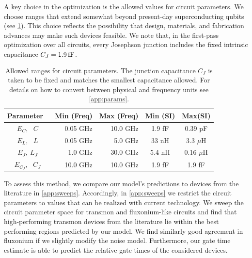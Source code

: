 A key choice in the optimization is the allowed values for circuit parameters. We choose ranges that extend somewhat beyond present-day superconducting qubits (see \cref{tab:params_overview}). This choice reflects the possibility that design, materials, and fabrication advances may make such devices feasible. We note that, in the first-pass optimization over all circuits, every Josephson junction includes the fixed intrinsic capacitance $C_J=1.9\,{\rm fF}$.

\begin{table}[htbp]
\setlength{\tabcolsep}{4.5pt}
\begin{tabular}{@{}crrcc@{}}
\toprule
Parameter \,\,      &  Min (Freq) & Max (Freq) & Min (SI) &  Max(SI) \\ \toprule
$E_C$,~ $C$                  & 0.05 GHz &  10.0 GHz & 1.9 fF  & 0.39 pF \\ \midrule
$E_L$,~ $L$                  & 0.05 GHz &  \phantom{1}5.0 GHz  & 33 nH  & 3.3 $\mu$H \\ \midrule
$E_J, ~L_J$                  & 1.0\phantom{0} GHz   & 30.0 GHz &  5.4 nH & 0.16 $\mu$H \\ \midrule
$E_{C_J}$, ~$C_J$ & 10.0\phantom{0} GHz & 10.0 GHz & 1.9 fF & 1.9 fF \\\bottomrule
\end{tabular}
\caption{Allowed ranges for circuit parameters. The junction capacitance $C_J$ is taken to be fixed and matches the smallest capacitance allowed. For details on how to convert between physical and frequency units see \cref{app:params}. }
\label{tab:params_overview}
\end{table}

To assess this method, we compare our model's predictions to devices from the literature in \cref{app:sweeps}. Accordingly, in \cref{app:sweeps} we restrict the circuit parameters to values that can be realized with current technology. We sweep the circuit parameter space for transmon and fluxonium-like circuits and find that high-performing transmon devices from the literature lie within the best performing regions predicted by our model. We find similarly good agreement in fluxonium if we slightly modify the noise model. Furthermore, our gate time estimate is able to predict the relative gate times of the considered devices.



